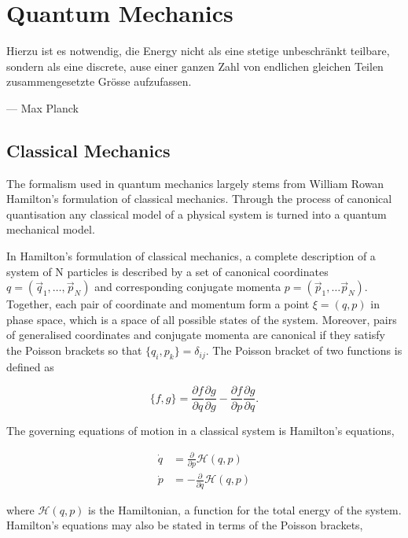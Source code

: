 \chapter{Quantum Mechanics}
    \epigraph{Hierzu ist es notwendig, die Energy nicht als eine stetige
    unbeschränkt teilbare, sondern als eine discrete, ause einer ganzen
    Zahl von endlichen gleichen Teilen zusammengesetzte Grösse 
    aufzufassen.}
    {--- Max Planck}


\section{Classical Mechanics}

    The formalism used in quantum mechanics largely stems from William Rowan Hamilton's 
    formulation of classical mechanics. Through the process of canonical
    quantisation any classical model of a physical system is turned into
    a quantum mechanical model.

    In Hamilton's formulation of classical mechanics, a complete description of a system
    of N particles is described by a set of canonical coordinates 
    $q = (\vec{q}_1, \dots, \vec{p}_N)$ and corresponding conjugate momenta
    $p = (\vec{p}_1, \dots \vec{p}_N)$. Together, each pair of coordinate and momentum
    form a point $\xi = (q, p)$ in phase space, which is a space of all possible states
    of the system. Moreover, pairs of generalised coordinates and conjugate
    momenta are canonical if they satisfy the Poisson brackets so that 
    $\{q_i, p_k\} = \delta_{ij}$. The Poisson bracket of two functions is defined as 

    \begin{equation}
        \label{eq:poisson_bracket}
        \{f, g\} = \frac{\partial f}{\partial q} \frac{\partial g}{\partial g}
        - \frac{\partial f}{\partial p} \frac{\partial g}{\partial q}.
    \end{equation}

    The governing equations of motion in a classical system is Hamilton's equations,

    \begin{align}
        \dot{q} &= \frac{\partial}{\partial p} \mathscr{H}(q, p) \\
        \dot{p} &= -\frac{\partial}{\partial q} \mathscr{H}(q, p)
    \end{align}

    where $\mathscr{H}(q, p)$ is the Hamiltonian, a function for the total energy of the
    system. Hamilton's equations may also be stated in terms of the Poisson brackets,

